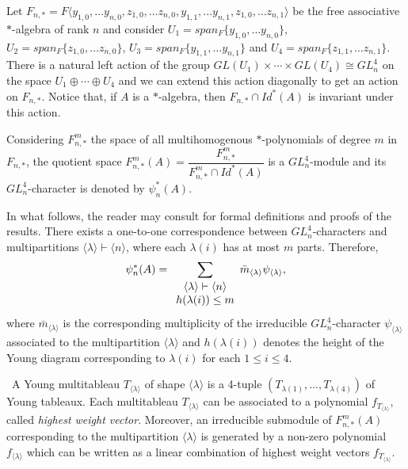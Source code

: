 \documentclass[10pt,a4paper]{amsart}
\begin{document}
	Let $F_{n,*}=F\langle y_{1,0},\ldots y_{n,0},z_{1,0},\ldots z_{n,0}, y_{1,1},\ldots y_{n,1}, z_{1,0},\ldots z_{n,1}\rangle$ be the free associative $*$-algebra of rank $n$ and consider $U_1=span_F\{{y_{1,0},\ldots y_{n,0}}\}$, $U_2=span_F\{{z_{1,0},\ldots z_{n,0}}\}$, $U_3=span_F\{{y_{1,1},\ldots y_{n,1}}\}$ and $U_4=span_F\{{z_{1,1},\ldots z_{n,1}}\}.$ There is a natural left action of the group $GL(U_1)\times \cdots\times GL(U_4)\cong GL_n^4$ on the space $U_1\oplus \cdots\oplus U_4$ and we can extend this action diagonally to get an action on $F_{n,*}$. Notice that, if $A$ is a $*$-algebra, then $F_{n,*}\cap Id^*(A)$ is invariant under this action.
	
	Considering $F^m_{n,*}$ the space of all multihomogenous $*$-polynomials of degree $m$ in $F_{n,*}$, the quotient space $F^m_{n,*}(A)=\dfrac{F^m_{n,*}}{F^m_{n,*}\cap Id^*(A)}$ is a $GL_n^4$-module and its $GL_n^4$-character is denoted by $\psi_n^{*}(A)$.
	

	
	In what follows, the reader may consult \cite{livro} for formal definitions and proofs of the results. There exists a one-to-one correspondence between $GL_n^4$-characters and multipartitions $\langle \lambda\rangle\vdash \langle n\rangle$, where each $\lambda(i)$ has at most $m$ parts. Therefore,\begin{equation}\label{cocharacter}
	\psi_n^*(A)=	\displaystyle \displaystyle{\sum_{ \tiny{\begin{array}{ccc}
						\langle \lambda \rangle \vdash \langle n\rangle\\
						h(\lambda(i))\leq m
		\end{array}}}} \bar{m}_{\langle \lambda \rangle}\psi_{\langle \lambda \rangle},
	\end{equation} where $\bar{m}_{\langle \lambda \rangle}$ is the corresponding multiplicity of the irreducible $GL_n^4$-character $\psi_{\langle \lambda \rangle}$ associated to the multipartition $\langle \lambda \rangle$ and $h(\lambda(i))$ denotes the height of the Young diagram corresponding to $\lambda(i)$ for each $1\le i\le 4$.
	
	\ A Young multitableau $T_{\langle \lambda \rangle}$ of shape $\langle \lambda \rangle$ is a 4-tuple $(T_{\lambda(1)},\ldots, T_{\lambda(4)})$ of Young tableaux. Each multitableau $T_{\langle \lambda \rangle}$ can be associated to a polynomial $f_{
	T_{\langle \lambda \rangle}},$ called {\em highest weight vector}. Moreover, an irreducible submodule of $F^m_{n,*}(A)$ corresponding to the multipartition $\langle \lambda \rangle$ is generated by a non-zero polynomial $f_{\langle \lambda \rangle}$ which can be written as a linear combination of highest weight vectors $f_{
	T_{\langle \lambda \rangle}}.$
	
\end{document}
